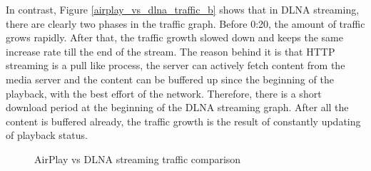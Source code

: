 In contrast, Figure \ref{airplay_vs_dlna_traffic_b} shows that in DLNA
streaming, there are clearly two phases in the traffic graph. Before 0:20, the
amount of traffic grows rapidly. After that, the traffic growth slowed down and
keeps the same increase rate till the end of the stream. The reason behind it
is that HTTP streaming is a pull like process, the server can actively fetch
content from the media server and the content can be buffered up since the
beginning of the playback, with the best effort of the network. Therefore,
there is a short download period at the beginning of the DLNA streaming graph.
After all the content is buffered already, the traffic growth is the result of
constantly updating of playback status.
\begin{figure}[hb]
\caption{AirPlay vs DLNA streaming traffic
comparison \label{airplay_vs_dlna_traffic}}
\end{figure}
\clearpage

